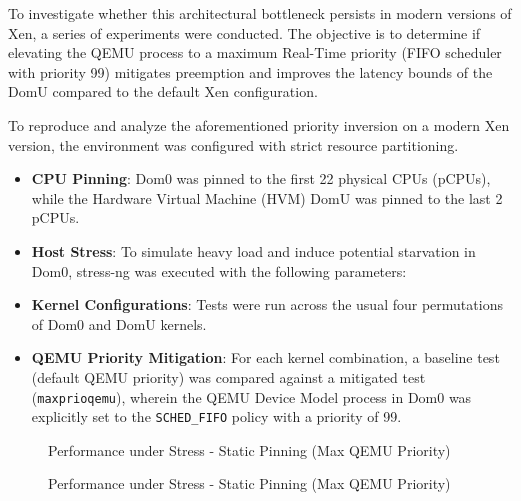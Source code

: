 To investigate whether this architectural bottleneck persists in modern
versions of Xen, a series of experiments were conducted. The objective
is to determine if elevating the QEMU process to a maximum Real-Time
priority (FIFO scheduler with priority 99) mitigates preemption and
improves the latency bounds of the DomU compared to the default Xen
configuration.

To reproduce and analyze the aforementioned priority inversion on a
modern Xen version, the environment was configured with strict resource
partitioning.

\begin{itemize}
\item
  \textbf{CPU Pinning}: Dom0 was pinned to the first 22 physical CPUs
  (pCPUs), while the Hardware Virtual Machine (HVM) DomU was pinned to
  the last 2 pCPUs.
\item
  \textbf{Host Stress}: To simulate heavy load and induce potential
  starvation in Dom0, stress-ng was executed with the following
  parameters:

\begin{Shaded}
\begin{Highlighting}[]
\end{Highlighting}
\end{Shaded}
\item
  \textbf{Kernel Configurations}: Tests were run across the usual four
  permutations of Dom0 and DomU kernels.
\item
  \textbf{QEMU Priority Mitigation}: For each kernel combination, a
  baseline test (default QEMU priority) was compared against a mitigated
  test (\texttt{maxprioqemu}), wherein the QEMU Device Model process in
  Dom0 was explicitly set to the \texttt{SCHED\_FIFO} policy with a
  priority of 99.
\end{itemize}

\begin{figure}
\centering

\caption{Performance under Stress - Static Pinning (Max QEMU Priority)}
\end{figure}

\begin{figure}
\centering

\caption{Performance under Stress - Static Pinning (Max QEMU Priority)}
\end{figure}

